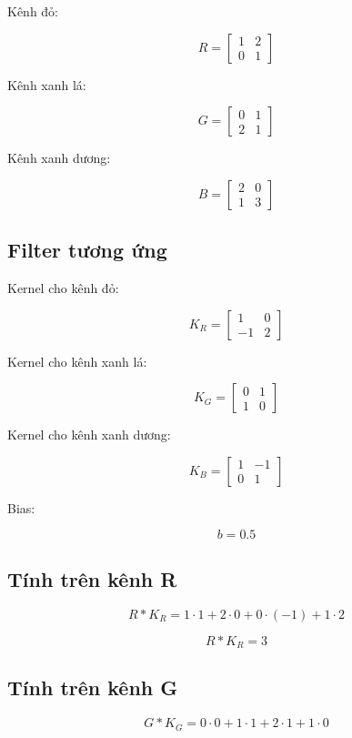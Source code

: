 Kênh đỏ:

\[
R=
\begin{bmatrix}
1 & 2\\
0 & 1
\end{bmatrix}
\]

Kênh xanh lá:

\[
G=
\begin{bmatrix}
0 & 1\\
2 & 1
\end{bmatrix}
\]

Kênh xanh dương:

\[
B=
\begin{bmatrix}
2 & 0\\
1 & 3
\end{bmatrix}
\]

\subsection{Filter tương ứng}

Kernel cho kênh đỏ:

\[
K_R=
\begin{bmatrix}
1 & 0\\
-1 & 2
\end{bmatrix}
\]

Kernel cho kênh xanh lá:

\[
K_G=
\begin{bmatrix}
0 & 1\\
1 & 0
\end{bmatrix}
\]

Kernel cho kênh xanh dương:

\[
K_B=
\begin{bmatrix}
1 & -1\\
0 & 1
\end{bmatrix}
\]

Bias:

\[
b=0.5
\]

\subsection{Tính trên kênh R}

\[
R*K_R
=
1\cdot1+2\cdot0+0\cdot(-1)+1\cdot2
\]

\[
R*K_R=3
\]

\subsection{Tính trên kênh G}

\[
G*K_G
=
0\cdot0+1\cdot1+2\cdot1+1\cdot0
\]

